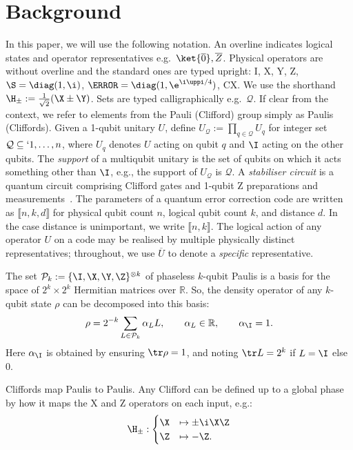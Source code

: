 \section{Background}
\label{sec:background}
In this paper,
we will use the following notation.
An overline indicates
logical states and operator representatives
e.g.\ $\ket{\overline{0}}, \overline{Z}$.
Physical operators are without overline
and the standard ones are typed upright:
I, X, Y, Z,
$\S =\diag(1, \i)$,
$\T =\diag(1, \e^{\i \uppi /4})$,
CX.
We use the shorthand $\H_\pm :=\frac{1}{\sqrt{2}}(\X \pm \Y)$.
Sets are typed calligraphically e.g.\ $\mathcal{Q}$.
If clear from the context,
we refer to elements from the Pauli (Clifford) group
simply as Paulis (Cliffords).
Given a 1-qubit unitary $U$,
define $U_\mathcal{Q} :=\prod_{q \in \mathcal{Q}} U_q$
for integer set $\mathcal{Q} \subseteq `{1, \dots, n}$,
where $U_q$ denotes $U$ acting on qubit $q$
and $\I$ acting on the other qubits.
The \emph{support} of a multiqubit unitary
is the set of qubits on which it acts something other than $\I$,
e.g., the support of $U_\mathcal{Q}$ is $\mathcal{Q}$.
A \emph{stabiliser circuit} is a quantum circuit comprising
Clifford gates and 1-qubit Z preparations and measurements~\cite{Aaronson2004}.
The parameters of a quantum error correction code are written as
$\llbracket n, k, d \rrbracket$
for physical qubit count $n$,
logical qubit count $k$,
and distance $d$.
In the case distance is unimportant,
we write $\llbracket n, k\rrbracket$.
The logical action of any operator $U$
on a code may be realised by
multiple physically distinct representatives;
throughout, we use $\overline{U}$ to denote
a \emph{specific} representative.

The set
$\mathcal P_k:=\{\I,\X,\Y,\Z\}^{\otimes k}$
of phaseless $k$-qubit Paulis
is a basis for the space of
$2^k \times 2^k$ Hermitian matrices over $\mathbb R$.
So,
the density operator of any $k$-qubit state $\rho$
can be decomposed into this basis:
\begin{equation}
\rho =
2^{-k} \sum_{L \in \mathcal{P}_k} \alpha_L L,
\qquad \alpha_L \in \mathbb R,
\qquad \alpha_\I =1.
\label{eq:pauli_decomposition}
\end{equation}
Here $\alpha_\I$ is obtained
by ensuring $\tr \rho =1$,
and noting $\tr L =2^k$ if $L =\I$ else 0.

Cliffords map Paulis to Paulis.
Any Clifford can be defined up to a global phase
by how it maps the X and Z operators on each input, e.g.:
\begin{equation}\label{eq:h_pm_action}
	\H_\pm: \begin{cases}
		\X &\mapsto \pm \i \X\Z \\
		\Z &\mapsto -\Z.
	\end{cases}
\end{equation}

